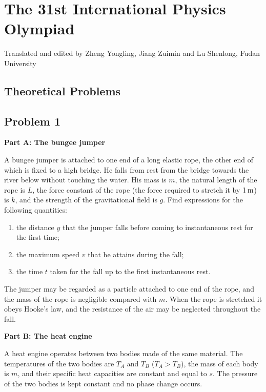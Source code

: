 \section*{The 31st International Physics Olympiad}

\begin{center}
Translated and edited by Zheng Yongling, Jiang Zuimin and Lu Shenlong, Fudan University
\end{center}

\subsection*{Theoretical Problems}

\subsection*{Problem 1}

\textbf{Part A: The bungee jumper}

A bungee jumper is attached to one end of a long elastic rope, the other end of which is fixed to a high bridge. He falls from rest from the bridge towards the river below without touching the water. His mass is $m$, the natural length of the rope is $L$, the force constant of the rope (the force required to stretch it by $1\,\mathrm{m}$) is $k$, and the strength of the gravitational field is $g$. Find expressions for the following quantities:

\begin{enumerate}
\item[(a)] the distance $y$ that the jumper falls before coming to instantaneous rest for the first time;
\item[(b)] the maximum speed $v$ that he attains during the fall;
\item[(c)] the time $t$ taken for the fall up to the first instantaneous rest.
\end{enumerate}

The jumper may be regarded as a particle attached to one end of the rope, and the mass of the rope is negligible compared with $m$. When the rope is stretched it obeys Hooke's law, and the resistance of the air may be neglected throughout the fall.

\textbf{Part B: The heat engine}

A heat engine operates between two bodies made of the same material. The temperatures of the two bodies are $T_A$ and $T_B$ ($T_A>T_B$), the mass of each body is $m$, and their specific heat capacities are constant and equal to $s$. The pressure of the two bodies is kept constant and no phase change occurs.

